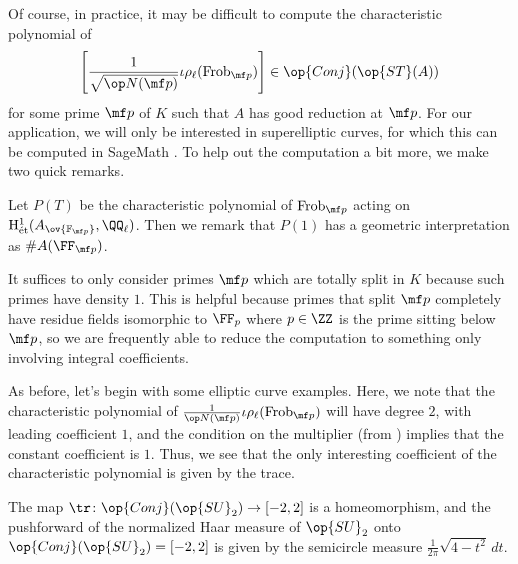 \documentclass[../thesis.tex]{subfiles}
\begin{document}
Of course, in practice, it may be difficult to compute the characteristic polynomial of
\[\left[\frac1{\sqrt{\op N(\mf p)}}\iota\rho_\ell(\mathrm{Frob}_{\mf p})\right]\in\op{Conj}(\op{ST}(A))\]
for some prime $\mf p$ of $K$ such that $A$ has good reduction at $\mf p$. For our application, we will only be interested in superelliptic curves, for which this can be computed in SageMath \cite{abcmt-cyclic-cover}. To help out the computation a bit more, we make two quick remarks.
\begin{remark}
	Let $P(T)$ be the characteristic polynomial of $\mathrm{Frob}_{\mf p}$ acting on $\mathrm H^1_{\mathrm{\acute et}}(A_{\ov{\mathbb F_{\mf p}}},\QQ_\ell)$. Then we remark that $P(1)$ has a geometric interpretation as $\#A(\FF_{\mf p})$.
\end{remark}
\begin{remark} \label{rem:only-use-split-complete-st}
	It suffices to only consider primes $\mf p$ which are totally split in $K$ because such primes have density $1$. This is helpful because primes that split $\mf p$ completely have residue fields isomorphic to $\FF_p$ where $p\in\ZZ$ is the prime sitting below $\mf p$, so we are frequently able to reduce the computation to something only involving integral coefficients.
\end{remark}
As before, let's begin with some elliptic curve examples. Here, we note that the characteristic polynomial of $\frac1{\op N(\mf p)}\iota\rho_\ell(\mathrm{Frob}_{\mf p})$ will have degree $2$, with leading coefficient $1$, and the condition on the multiplier (from ) implies that the constant coefficient is $1$. Thus, we see that the only interesting coefficient of the characteristic polynomial is given by the trace.
\begin{lemma} \label{lem:measure-conj-su2}
	The map $\tr\colon\op{Conj}({\op{SU}_2})\to[-2,2]$ is a homeomorphism, and the pushforward of the normalized Haar measure of $\op{SU}_2$ onto $\op{Conj}({\op{SU}_2})=[-2,2]$ is given by the semicircle measure $\frac1{2\pi}\sqrt{4-t^2}\,dt$.
\end{lemma}
\end{document}

